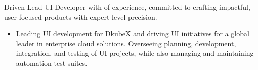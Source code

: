 \documentclass[10pt,a4paper,ragged2e]{altacv}
\begin{document}


\begin{fullwidth}
\makecvheader
\end{fullwidth}

\begin{fullwidth}
Driven Lead UI Developer with \textbf{} of experience, committed to crafting impactful, user-focused products with expert-level precision.
\end{fullwidth}



\begin{itemize}
\item Leading UI development for DkubeX and driving UI initiatives for a global leader in enterprise cloud solutions. Overseeing planning, development, integration, and testing of UI projects, while also managing and maintaining automation test suites.
\end{itemize}

\divider
\end{document}
